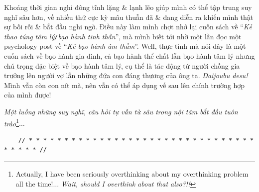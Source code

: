 \documentclass[12pt]{article}
\begin{document}
Khoảng thời gian nghỉ đông tĩnh lặng \& lạnh lẽo giúp mình có thể tập trung suy nghĩ sâu hơn, về nhiều thứ cực kỳ mâu thuẫn đã \& đang diễn ra khiến mình thật sự bối rối \& bắt đầu nghi ngờ. Điều này làm mình chợt nhớ lại cuốn sách \cite{Bancroft_why_he_do,Bancroft_why_he_do_VN} về ``{\it Kẻ thao túng tâm lý{\tt/}bạo hành tinh thần}'', mà mình biết tới nhờ một lần đọc một psychology post về ``{\it Kẻ bạo hành âm thầm}''. Well, thực tình mà nói đây là một cuốn sách về bạo hành gia đình, cả bạo hành thể chất lẫn bạo hành tâm lý nhưng chú trọng đặc biệt về bạo hành tâm lý, cụ thể là tác động từ người chồng gia trưởng lên người vợ lẫn những đứa con đáng thương của ông ta. {\it Daijoubu desu!} Mình vẫn còn con nít mà, nên vẫn có thể áp dụng vế sau lên chính trường hợp của mình được!

{\it Một luồng những suy nghĩ, câu hỏi tự vấn từ sâu trong nội tâm bắt đầu tuôn trào}\footnote{Actually, I have been seriously overthinking about my overthinking problem all the time!$\ldots$ {\it Wait, should I overthink about that also?!!}}$\ldots$

\begin{verbatim}
	// * * * * * * * * * * * * * * * * * * * * * * * * * * * * * * * * * * * * * //
\end{verbatim}
\end{document}
